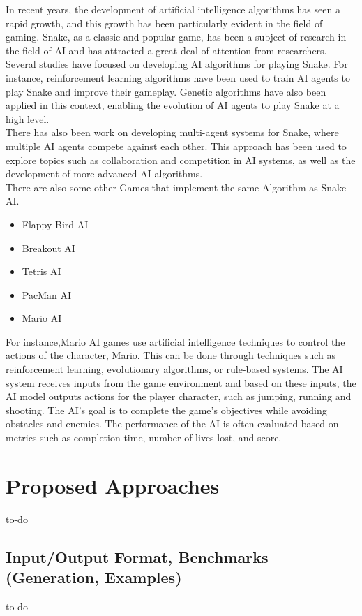 \documentclass[a4paper,12pt]{article}
\begin{document}
In recent years, the development of artificial intelligence algorithms has seen a rapid growth,
and this growth has been particularly evident in the field of gaming. Snake, as a classic and popular game, 
has been a subject of research in the field of AI and has attracted a great deal of attention from researchers.\\
Several studies have focused on developing AI algorithms for playing Snake. For instance, reinforcement learning 
algorithms have been used to train AI agents to play Snake and improve their gameplay. Genetic algorithms have also
been applied in this context, enabling the evolution of AI agents to play Snake at a high level.\\
There has also been work on developing multi-agent systems for Snake, where multiple AI agents compete against each other.
This approach has been used to explore topics such as collaboration and competition in AI systems, as well as the development of more advanced AI algorithms.\\
There are also some other Games that implement the same Algorithm as Snake AI.\cite{RelatedWork}
\begin{itemize}
\item Flappy Bird AI
\item Breakout AI
\item Tetris AI
\item PacMan AI
\item Mario AI
\end{itemize}
For instance,Mario AI games use artificial intelligence techniques to control the actions of the character,
Mario. This can be done through techniques such as reinforcement learning, evolutionary algorithms,
or rule-based systems. The AI system receives inputs from the game environment and based on these inputs,
the AI model outputs actions for the player character, such as jumping, running and shooting.
The AI's goal is to complete the game's objectives while avoiding obstacles and enemies.
The performance of the AI is often evaluated based on metrics such as completion time, number of lives lost, and score.

\section{Proposed Approaches}
to-do
\subsection{Input/Output Format, Benchmarks (Generation, Examples)}
to-do
\end{document}
